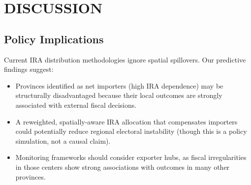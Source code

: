 \documentclass[conference]{IEEEtran}
\begin{document}
\section{DISCUSSION}

\subsection{Policy Implications}
Current IRA distribution methodologies ignore spatial spillovers. Our predictive findings suggest:
\begin{itemize}
\item Provinces identified as net importers (high IRA dependence) may be structurally disadvantaged because their local outcomes are strongly associated with external fiscal decisions.
\item A reweighted, spatially-aware IRA allocation that compensates importers could potentially reduce regional electoral instability (though this is a policy simulation, not a causal claim).
\item Monitoring frameworks should consider exporter hubs, as fiscal irregularities in those centers show strong associations with outcomes in many other provinces.
\end{itemize}
\end{document}
